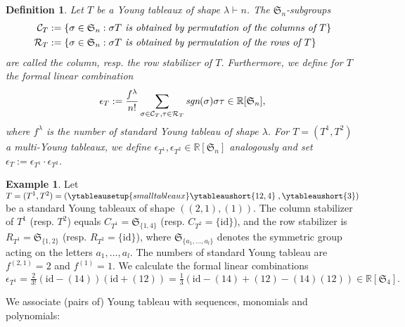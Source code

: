 \documentclass[11pt,a4paper]{amsart}
\numberwithin{equation}{section}
\newtheorem{definition}[thm]{Definition}
\theoremstyle{definition}
\newtheorem{example}[thm]{Example}
\newcommand{\R}{\mathbb{R}}
\numberwithin{thm}{section}
\theoremstyle{break}
\numberwithin{subcase}{case}
\begin{document}
\begin{definition}
 Let $T$ be a Young tableaux of shape $\lambda \vdash n$. The $\mathfrak{S}_n$-subgroups \begin{align*}
    \mathcal{C}_T & := \left\{ \sigma \in \mathfrak{S}_n : \sigma T \emph{ is obtained by permutation of the columns of } T\right\}  \\
    \mathcal{R}_T & := \left\{ \sigma \in \mathfrak{S}_n : \sigma T \emph{ is obtained by permutation of the rows of } T\right\}
\end{align*}are called the column, resp. the row stabilizer of $T$. Furthermore, we define for $T$ the formal linear combination $$\epsilon_T := \frac{f^\lambda}{n!}\sum_{\sigma \in \mathcal{C}_T, \tau \in \mathcal{R}_T} \emph{sgn} (\sigma) \sigma \tau \in \R[\mathfrak{S}_n],$$ where $f^\lambda$ is the number of standard Young tableau of shape $\lambda$. For $T = (T^1,T^2)$ a multi-Young tableaux, we define $\epsilon_{T^1}, \epsilon_{T^2} \in \R[\mathfrak{S}_n]$ analogously and set $\epsilon_T := \epsilon_{T^1}\cdot \epsilon_{T^2}$.
\end{definition}
\begin{example}
Let $T=(T^1,T^2)=\left( \ytableausetup{smalltableaux}
  \ytableaushort{
   12,4}\; ,
  \ytableaushort{
   3} \right)$ be a standard Young tableaux of shape $((2,1),(1))$. The column stabilizer of $T^1$ (resp. $T^2$) equals $C_{T^1}=\mathfrak{S}_{\{1,4\}}$ (resp. $C_{T^2}=\{\text{id}\}$), and the row stabilizer is $R_{T^1}=\mathfrak{S}_{\{1,2\}}$ (resp. $R_{T^2}=\{\text{id}\}$), where $\mathfrak{S}_{\{a_1,\ldots,a_l\}}$ denotes the symmetric group acting on the letters $a_1,\ldots,a_l.$ The numbers of standard Young tableau are $f^{(2,1)}=2$ and $f^{(1)} =1$. We calculate the formal linear combinations $\epsilon_{T^1}=\frac{2}{3!}(\text{id}-(14))(\text{id}+(12))=\frac{1}{3}(\text{id}-(14)+(12)-(14)(12)) \in \R[\mathfrak{S}_4].$
\end{example}
We associate (pairs of) Young tableau with sequences, monomials and polynomials:
\end{document}
